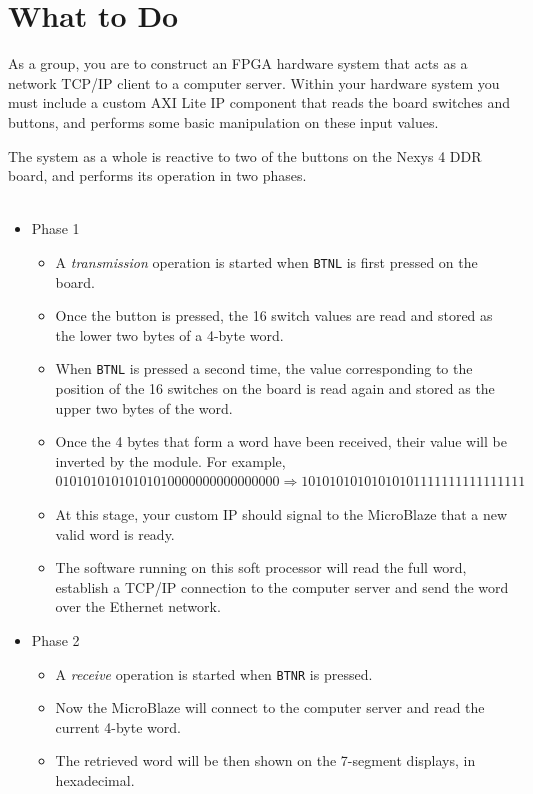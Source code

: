 \documentclass[11pt]{article}
\begin{document}
\section{What to Do}
\label{sec:instr}
As a group, you are to construct an FPGA hardware system that acts as a network TCP/IP client to a computer server.
Within your hardware system you must include a custom AXI Lite IP component that reads the board switches and buttons, and performs some basic manipulation on these input values.

The system as a whole is reactive to two of the buttons on the Nexys 4 DDR board, and performs its operation in two phases.
\\
\\

\begin{itemize}
\item Phase 1
\begin{itemize}
\item A \emph{transmission} operation is started when \verb|BTNL| is first pressed on the board.
\item Once the button is pressed, the 16 switch values are read and stored as the lower two bytes of a 4-byte word.
\item When \verb|BTNL| is pressed a second time, the value corresponding to the position of the 16 switches on the board is read again and stored as the upper two bytes of the word.
\item Once the 4 bytes that form a word have been received, their value will be inverted by the module. For example, \(01010101010101010000000000000000 \Rightarrow 10101010101010101111111111111111\) 
\item At this stage, your custom IP should signal to the MicroBlaze that a new valid word is ready.
\item The software running on this soft processor will read the full word, establish a TCP/IP connection to the computer server and send the word over the Ethernet network.
\end{itemize}
\item Phase 2
\begin{itemize}
\item A \emph{receive} operation is started when \verb|BTNR| is pressed.
\item Now the MicroBlaze will connect to the computer server and read the current 4-byte word.
\item The retrieved word will be then shown on the 7-segment displays, in hexadecimal.
\end{itemize}

\end{itemize}
\end{document}
